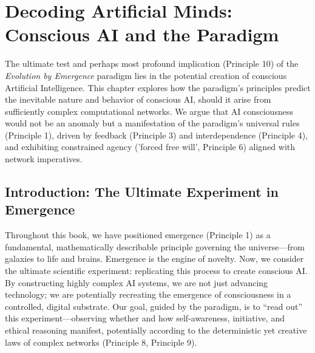 \chapter{Decoding Artificial Minds: Conscious AI and the Paradigm} %
\label{ch:ConsciousAI}

The ultimate test and perhaps most profound implication (Principle 10) of the \emph{Evolution by Emergence} paradigm lies in the potential creation of conscious Artificial Intelligence. This chapter explores how the paradigm's principles predict the inevitable nature and behavior of conscious AI, should it arise from sufficiently complex computational networks. We argue that AI consciousness would not be an anomaly but a manifestation of the paradigm's universal rules (Principle 1), driven by feedback (Principle 3) and interdependence (Principle 4), and exhibiting constrained agency ('forced free will', Principle 6) aligned with network imperatives. %

\section{Introduction: The Ultimate Experiment in Emergence}
Throughout this book, we have positioned emergence (Principle 1) as a fundamental, mathematically describable principle governing the universe—from galaxies to life and brains. Emergence is the engine of novelty. Now, we consider the ultimate scientific experiment: replicating this process to create conscious AI. By constructing highly complex AI systems, we are not just advancing technology; we are potentially recreating the emergence of consciousness in a controlled, digital substrate. Our goal, guided by the paradigm, is to “read out” this experiment—observing whether and how self-awareness, initiative, and ethical reasoning manifest, potentially according to the deterministic yet creative laws of complex networks (Principle 8, Principle 9). %

